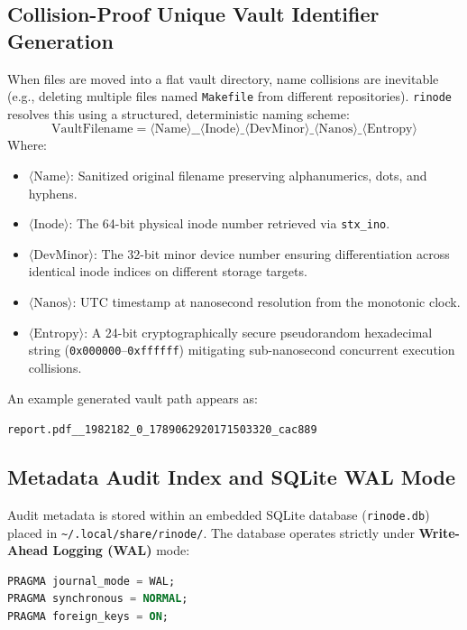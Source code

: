 \documentclass[11pt,a4paper]{article}
\begin{document}
\subsection{Collision-Proof Unique Vault Identifier Generation}
When files are moved into a flat vault directory, name collisions are inevitable (e.g., deleting multiple files named \texttt{Makefile} from different repositories). \texttt{rinode} resolves this using a structured, deterministic naming scheme:
\begin{equation}
    \text{VaultFilename} = \langle\text{Name}\rangle\text{\_\_}\langle\text{Inode}\rangle\text{\_}\langle\text{DevMinor}\rangle\text{\_}\langle\text{Nanos}\rangle\text{\_}\langle\text{Entropy}\rangle
\end{equation}
Where:
\begin{itemize}[leftmargin=1.5em]
    \item $\langle\text{Name}\rangle$: Sanitized original filename preserving alphanumerics, dots, and hyphens.
    \item $\langle\text{Inode}\rangle$: The 64-bit physical inode number retrieved via \texttt{stx\_ino}.
    \item $\langle\text{DevMinor}\rangle$: The 32-bit minor device number ensuring differentiation across identical inode indices on different storage targets.
    \item $\langle\text{Nanos}\rangle$: UTC timestamp at nanosecond resolution from the monotonic clock.
    \item $\langle\text{Entropy}\rangle$: A 24-bit cryptographically secure pseudorandom hexadecimal string (\texttt{0x000000}--\texttt{0xffffff}) mitigating sub-nanosecond concurrent execution collisions.
\end{itemize}

An example generated vault path appears as:
\begin{center}
\texttt{report.pdf\_\_1982182\_0\_1789062920171503320\_cac889}
\end{center}

\subsection{Metadata Audit Index and SQLite WAL Mode}
Audit metadata is stored within an embedded SQLite database (\texttt{rinode.db}) placed in \texttt{\~{}/.local/share/rinode/}. The database operates strictly under \textbf{Write-Ahead Logging (WAL)} mode:
\begin{lstlisting}[language=SQL]
PRAGMA journal_mode = WAL;
PRAGMA synchronous = NORMAL;
PRAGMA foreign_keys = ON;
\end{lstlisting}
\end{document}
